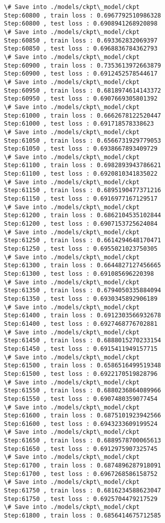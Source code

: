 \documentclass[11pt]{article}
\begin{document}
\begin{Verbatim}[commandchars=\\\{\}]
\# Save into ./models/ckpt\_model/ckpt
Step:60800 , train loss : 0.6967792510986328
Step:60800 , test loss : 0.6908941268920898
\# Save into ./models/ckpt\_model/ckpt
Step:60850 , train loss : 0.693362832069397
Step:60850 , test loss : 0.6968836784362793
\# Save into ./models/ckpt\_model/ckpt
Step:60900 , train loss : 0.7353613972663879
Step:60900 , test loss : 0.6912452578544617
\# Save into ./models/ckpt\_model/ckpt
Step:60950 , train loss : 0.6818974614143372
Step:60950 , test loss : 0.6907669305801392
\# Save into ./models/ckpt\_model/ckpt
Step:61000 , train loss : 0.6662678122520447
Step:61000 , test loss : 0.691718578338623
\# Save into ./models/ckpt\_model/ckpt
Step:61050 , train loss : 0.6566731929779053
Step:61050 , test loss : 0.6938667893409729
\# Save into ./models/ckpt\_model/ckpt
Step:61100 , train loss : 0.6982893943786621
Step:61100 , test loss : 0.6920810341835022
\# Save into ./models/ckpt\_model/ckpt
Step:61150 , train loss : 0.6895190477371216
Step:61150 , test loss : 0.6916977167129517
\# Save into ./models/ckpt\_model/ckpt
Step:61200 , train loss : 0.6862104535102844
Step:61200 , test loss : 0.6907153725624084
\# Save into ./models/ckpt\_model/ckpt
Step:61250 , train loss : 0.6614294648170471
Step:61250 , test loss : 0.6955021023750305
\# Save into ./models/ckpt\_model/ckpt
Step:61300 , train loss : 0.6644827127456665
Step:61300 , test loss : 0.691085696220398
\# Save into ./models/ckpt\_model/ckpt
Step:61350 , train loss : 0.6794050335884094
Step:61350 , test loss : 0.6930345892906189
\# Save into ./models/ckpt\_model/ckpt
Step:61400 , train loss : 0.6912303566932678
Step:61400 , test loss : 0.6927468776702881
\# Save into ./models/ckpt\_model/ckpt
Step:61450 , train loss : 0.6888015270233154
Step:61450 , test loss : 0.6915411949157715
\# Save into ./models/ckpt\_model/ckpt
Step:61500 , train loss : 0.6586516499519348
Step:61500 , test loss : 0.6922170519828796
\# Save into ./models/ckpt\_model/ckpt
Step:61550 , train loss : 0.6880236864089966
Step:61550 , test loss : 0.6907480359077454
\# Save into ./models/ckpt\_model/ckpt
Step:61600 , train loss : 0.6875101923942566
Step:61600 , test loss : 0.6943233609199524
\# Save into ./models/ckpt\_model/ckpt
Step:61650 , train loss : 0.6889578700065613
Step:61650 , test loss : 0.6912975907325745
\# Save into ./models/ckpt\_model/ckpt
Step:61700 , train loss : 0.6874896287918091
Step:61700 , test loss : 0.6967268586158752
\# Save into ./models/ckpt\_model/ckpt
Step:61750 , train loss : 0.6816234588623047
Step:61750 , test loss : 0.6925704479217529
\# Save into ./models/ckpt\_model/ckpt
Step:61800 , train loss : 0.6856414675712585

\end{Verbatim}
\end{document}
